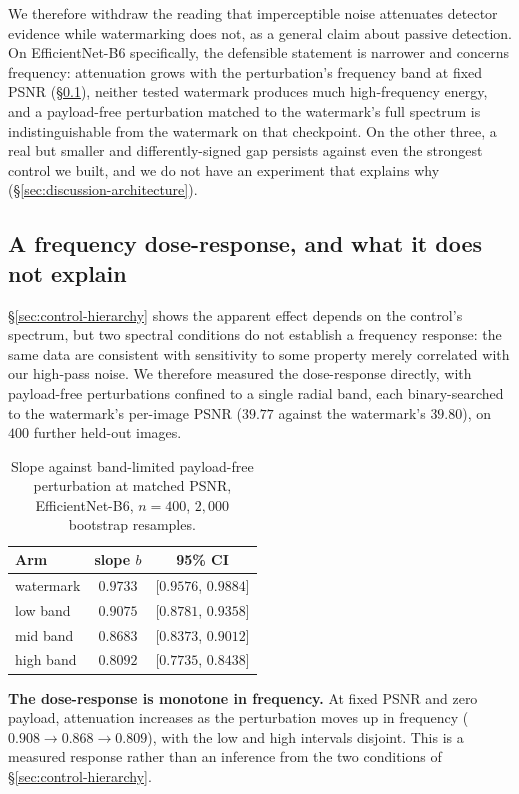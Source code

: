 \documentclass[journal]{IEEEtran}
\begin{document}
We therefore withdraw the reading that imperceptible noise attenuates detector
evidence while watermarking does not, as a general claim about passive
detection. On EfficientNet-B6 specifically, the defensible statement is
narrower and concerns frequency: attenuation grows with the perturbation's
frequency band at fixed PSNR (\S\ref{sec:frequency}), neither tested watermark
produces much high-frequency energy, and a payload-free perturbation matched
to the watermark's full spectrum is indistinguishable from the watermark on
that checkpoint. On the other three, a real but smaller and differently-signed
gap persists against even the strongest control we built, and we do not have
an experiment that explains why (\S\ref{sec:discussion-architecture}).

\subsection{A frequency dose-response, and what it does not explain}
\label{sec:frequency}

\S\ref{sec:control-hierarchy} shows the apparent effect depends on the
control's spectrum, but two spectral conditions do not establish a frequency
response: the same data are consistent with sensitivity to some property
merely correlated with our high-pass noise. We therefore measured the
dose-response directly, with payload-free perturbations confined to a single
radial band, each binary-searched to the watermark's per-image PSNR
($39.77$ against the watermark's $39.80$), on $400$ further held-out images.

\begin{table}[t]
\centering
\caption{Slope against band-limited payload-free perturbation at matched PSNR,
EfficientNet-B6, $n=400$, $2{,}000$ bootstrap resamples.}
\label{tab:frequency}
\footnotesize
\begin{tabular}{lcc}
\toprule
Arm & slope $b$ & 95\% CI \\
\midrule
watermark & $0.9733$ & [$0.9576$, $0.9884$] \\
low band & $0.9075$ & [$0.8781$, $0.9358$] \\
mid band & $0.8683$ & [$0.8373$, $0.9012$] \\
high band & $\mathbf{0.8092}$ & [$0.7735$, $0.8438$] \\
\bottomrule
\end{tabular}
\end{table}

\textbf{The dose-response is monotone in frequency.} At fixed PSNR and zero
payload, attenuation increases as the perturbation moves up in frequency
($0.908 \to 0.868 \to 0.809$), with the low and high intervals disjoint. This
is a measured response rather than an inference from the two conditions of
\S\ref{sec:control-hierarchy}.
\end{document}

